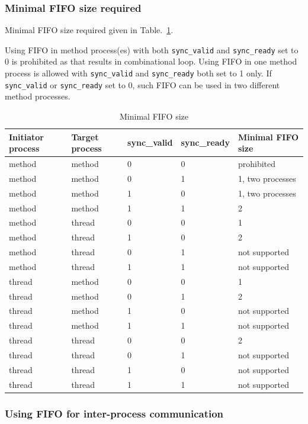\subsubsection{Minimal FIFO size required}

Minimal FIFO size required given in Table.~\ref{tab:fifo_size}.

Using FIFO in method process(es) with both {\tt sync\_valid} and {\tt sync\_ready} set to 0 is prohibited as that results in combinational loop. Using FIFO in one method process is allowed with {\tt sync\_valid} and {\tt sync\_ready} both set to 1 only. If {\tt sync\_valid} or {\tt sync\_ready} set to 0, such FIFO can be used in two different method processes.

\begin{table}
\begin{tabular}{|l|l|l|l|l|}
\hline
Initiator process & Target process & sync\_valid & sync\_ready & Minimal FIFO size \\
\hline
method & method & 0 & 0 & prohibited \\
method & method & 0 & 1 & 1, two processes \\
method & method & 1 & 0 & 1, two processes \\
method & method & 1 & 1 & 2 \\
method & thread & 0 & 0 & 1 \\
method & thread & 1 & 0 & 2 \\
method & thread & 0 & 1 & not supported \\
method & thread & 1 & 1 & not supported \\
thread & method & 0 & 0 & 1 \\
thread & method & 0 & 1 & 2 \\
thread & method & 1 & 0 & not supported \\
thread & method & 1 & 1 & not supported \\
thread & thread & 0 & 0 & 2 \\
thread & thread & 0 & 1 & not supported \\
thread & thread & 1 & 0 & not supported \\
thread & thread & 1 & 1 & not supported \\
\hline
\end{tabular}
\caption{Minimal FIFO size}
\label{tab:fifo_size}
\end{table}

\subsubsection{Using FIFO for inter-process communication}

